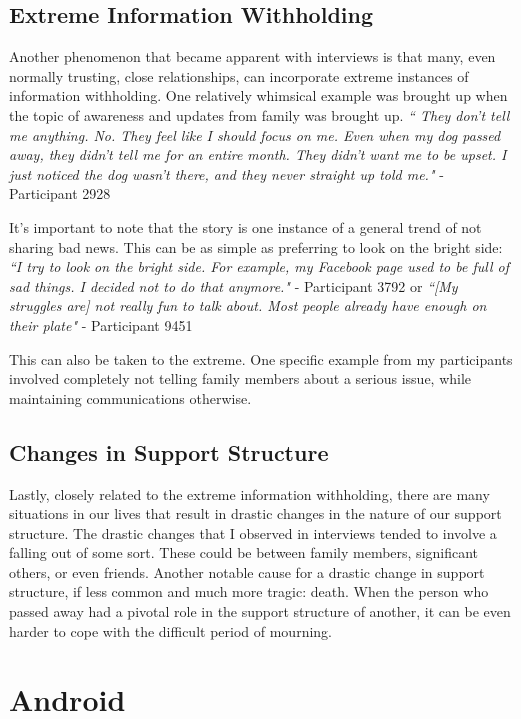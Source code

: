   \subsection{Extreme Information Withholding}
  Another phenomenon that became apparent with interviews is that
  many, even normally trusting, close relationships,
  can incorporate extreme instances of information withholding.
  One relatively whimsical example was brought up
  when the topic of awareness and updates from family was brought up.
  \textit{
    ``
    They don't tell me anything. No.
    They feel like I should focus on me.
    Even when my dog passed away, they didn't tell me for an entire month.
    They didn't want me to be upset.
    I just noticed the dog wasn't there, and they never straight up told me."
  } - Participant 2928

  It's important to note that the story is one instance of a general
  trend of not sharing bad news.
  This can be as simple as preferring to look on the bright side:
  \textit{
  ``I try to look on the bright side.
  For example, my Facebook page used to be full of sad things.
  I decided not to do that anymore."
  } - Participant 3792
  or \textit{
  ``[My struggles are] not really fun to talk about.
  Most people already have enough on their plate"
  }
  - Participant 9451
  
  This can also be taken to the extreme.
  One specific example from my participants involved
  completely not telling family members about a serious issue,
  while maintaining communications otherwise.

  \subsection{Changes in Support Structure}
  Lastly, closely related to the extreme information withholding,
  there are many situations in our lives that result in
  drastic changes in the nature of our support structure.
  The drastic changes that I observed in interviews
  tended to involve a falling out of some sort.
  These could be between family members,
  significant others, or even friends.
  Another notable cause for a drastic change in support structure,
  if less common and much more tragic: death.
  When the person who passed away had a pivotal role in the support
  structure of another, it can be even harder to cope with
  the difficult period of mourning.

\section{Android}
\label{sec:Android}

